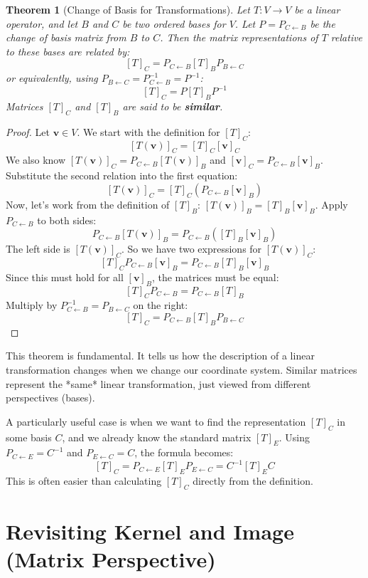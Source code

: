 \documentclass[11pt]{article}
\newtheorem{theorem}{Theorem}[section]
\theoremstyle{definition}
\theoremstyle{remark}
\begin{document}
\begin{theorem}[Change of Basis for Transformations]
Let $T: V \to V$ be a linear operator, and let $B$ and $C$ be two ordered bases for $V$. Let $P = P_{C \leftarrow B}$ be the change of basis matrix from $B$ to $C$. Then the matrix representations of $T$ relative to these bases are related by:
\[ [T]_C = P_{C \leftarrow B} [T]_B P_{B \leftarrow C} \]
or equivalently, using $P_{B \leftarrow C} = P_{C \leftarrow B}^{-1} = P^{-1}$:
\[ [T]_C = P [T]_B P^{-1} \]
Matrices $[T]_C$ and $[T]_B$ are said to be \textbf{similar}.
\end{theorem}
\begin{proof}
Let $\mathbf{v} \in V$. We start with the definition for $[T]_C$:
\[ [T(\mathbf{v})]_C = [T]_C [\mathbf{v}]_C \]
We also know $[T(\mathbf{v})]_C = P_{C \leftarrow B} [T(\mathbf{v})]_B$ and $[\mathbf{v}]_C = P_{C \leftarrow B} [\mathbf{v}]_B$.
Substitute the second relation into the first equation:
\[ [T(\mathbf{v})]_C = [T]_C (P_{C \leftarrow B} [\mathbf{v}]_B) \]
Now, let's work from the definition of $[T]_B$: $[T(\mathbf{v})]_B = [T]_B [\mathbf{v}]_B$. Apply $P_{C \leftarrow B}$ to both sides:
\[ P_{C \leftarrow B} [T(\mathbf{v})]_B = P_{C \leftarrow B} ([T]_B [\mathbf{v}]_B) \]
The left side is $[T(\mathbf{v})]_C$. So we have two expressions for $[T(\mathbf{v})]_C$:
\[ [T]_C P_{C \leftarrow B} [\mathbf{v}]_B = P_{C \leftarrow B} [T]_B [\mathbf{v}]_B \]
Since this must hold for all $[\mathbf{v}]_B$, the matrices must be equal:
\[ [T]_C P_{C \leftarrow B} = P_{C \leftarrow B} [T]_B \]
Multiply by $P_{C \leftarrow B}^{-1} = P_{B \leftarrow C}$ on the right:
\[ [T]_C = P_{C \leftarrow B} [T]_B P_{B \leftarrow C} \]
\end{proof}

This theorem is fundamental. It tells us how the description of a linear transformation changes when we change our coordinate system. Similar matrices represent the *same* linear transformation, just viewed from different perspectives (bases).

A particularly useful case is when we want to find the representation $[T]_C$ in some basis $C$, and we already know the standard matrix $[T]_E$. Using $P_{C \leftarrow E} = C^{-1}$ and $P_{E \leftarrow C} = C$, the formula becomes:
\[ [T]_C = P_{C \leftarrow E} [T]_E P_{E \leftarrow C} = C^{-1} [T]_E C \]
This is often easier than calculating $[T]_C$ directly from the definition.

\section{Revisiting Kernel and Image (Matrix Perspective)}
\end{document}
